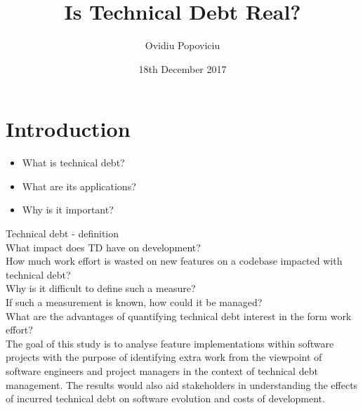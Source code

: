 \documentclass{mprop}
\begin{document}
\title{Is Technical Debt Real?}
\author{Ovidiu Popoviciu}
\date{18th December 2017}
\maketitle

\tableofcontents
\newpage

\section{Introduction}
\label{intro}

\begin{itemize}
	\item What is technical debt?
	\item What are its applications?
	\item Why is it important?
\end{itemize}

Technical debt - definition \\
What impact does TD have on development?\\
How much work effort is wasted on new features on a codebase impacted with
technical debt?\\
Why is it difficult to define such a measure? \\
If such a measurement is known, how could it be managed? \\
What are the advantages of quantifying technical debt interest in the form work
effort? \\

The goal of this study is to analyse feature implementations within software
projects with the purpose of identifying extra work from the viewpoint of
software engineers and project managers in the context of technical debt
management. The results would also aid stakeholders in understanding the effects
of incurred technical debt on software evolution and costs of development.
\end{document}
